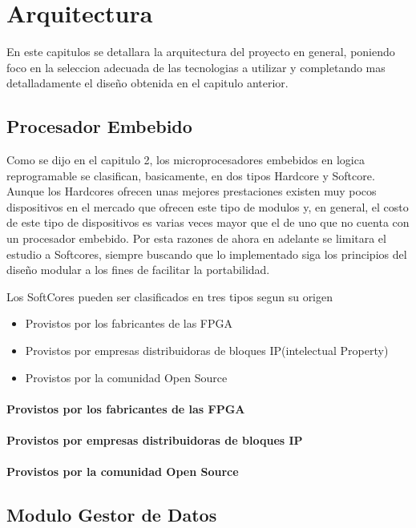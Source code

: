 \chapter{Arquitectura}
En este capitulos se detallara la arquitectura del proyecto en general, poniendo foco en la seleccion adecuada de las tecnologias a utilizar y completando mas detalladamente el diseño obtenida en el capitulo anterior.

\section{Procesador Embebido}

Como se dijo en el capitulo 2, los microprocesadores embebidos en logica reprogramable se clasifican, basicamente, en dos tipos Hardcore y Softcore. Aunque los Hardcores ofrecen unas mejores prestaciones existen muy pocos dispositivos en el mercado que ofrecen este tipo de modulos y, en general, el costo de este tipo de dispositivos es varias veces mayor que el de uno que no cuenta con un procesador embebido. Por esta razones de ahora en adelante se limitara el estudio a Softcores, siempre buscando que lo implementado siga los principios del diseño modular a los fines de facilitar la portabilidad.

Los SoftCores pueden ser clasificados en tres tipos segun su origen

\begin{itemize}
	\item Provistos por los fabricantes de las FPGA
	\item Provistos por empresas distribuidoras de bloques IP(intelectual Property)
	\item Provistos por la comunidad Open Source
\end{itemize}

\subsubsection{Provistos por los fabricantes de las FPGA}
\subsubsection{Provistos por empresas distribuidoras de bloques IP}
\subsubsection{Provistos por la comunidad Open Source}

 
\section{Modulo Gestor de Datos}
